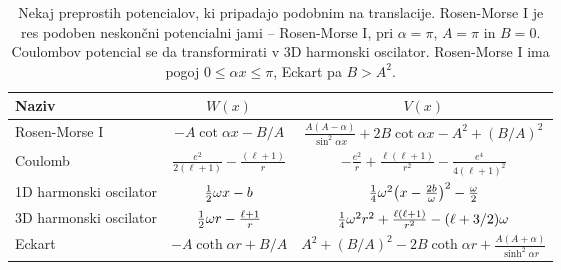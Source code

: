 \begin{table}[H]\centering
	\caption{Nekaj preprostih potencialov, ki pripadajo podobnim na translacije. Rosen-Morse I je res podoben
		neskon\v cni potencialni jami -- Rosen-Morse I, pri $\alpha = \pi$, $A = \pi$ in $B = 0$. Coulombov
		potencial se da transformirati v 3D harmonski oscilator. Rosen-Morse I ima pogoj $0 \leq \alpha x \leq \pi$,
		Eckart pa $B > A^2$.}
	\label{tab1}
	\vspace{0.2cm}
	\begin{tabular}{l || c | c}
		Naziv & $W(x)$ & $V(x)$\\ \hline
		Rosen-Morse I & $-A \cot \alpha x - B/A$ & $\frac{A (A - \alpha)}{\sin^2 \alpha x} + 2B\cot\alpha x - A^2
			+ (B/A)^2$ \\
		Coulomb & $\frac{e^2}{2(\ell+1)} - \frac{(\ell+1)}{r}$ & $-\frac{e^2}{r} + \frac{\ell(\ell+1)}{r^2} -
			\frac{e^4}{4(\ell + 1)^2}$ \\
		1D harmonski oscilator & $\frac{1}{2}\omega x - b$ & $\frac{1}{4}\omega^2\big(x - \frac{2b}{\omega}\big)^2 - \frac{\omega}{2}$ \\
		3D harmonski oscilator & $\frac{1}{2}\omega r - \frac{\ell + 1}{r}$ & $\frac{1}{4}\omega^2r^2 +
			\frac{\ell(\ell + 1)}{r^2} - (\ell + 3/2)\omega$ \\
		Eckart & $-A\coth\alpha r + B/A$ & $A^2 + (B/A)^2 - 2B\coth\alpha r + \frac{A(A + \alpha)}{\sinh^2 \alpha r}$ \\
	\end{tabular}
\end{table}

